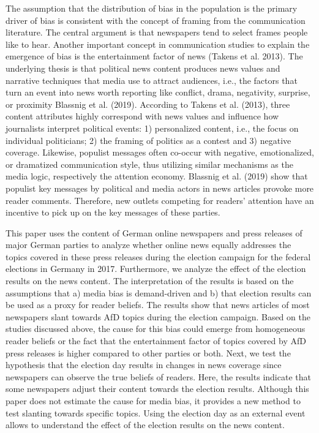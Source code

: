\documentclass[
  12pt,
]{article}
\begin{document}
The assumption that the distribution of bias in the population is the
primary driver of bias is consistent with the concept of framing from
the communication literature. The central argument is that newspapers
tend to select frames people like to hear. Another important concept in
communication studies to explain the emergence of bias is the
entertainment factor of news (Takens et al. 2013). The underlying thesis
is that political news content produces news values and narrative
techniques that media use to attract audiences, i.e., the factors that
turn an event into news worth reporting like conflict, drama,
negativity, surprise, or proximity Blassnig et al. (2019). According to
Takens et al. (2013), three content attributes highly correspond with
news values and influence how journalists interpret political events: 1)
personalized content, i.e., the focus on individual politicians; 2) the
framing of politics as a contest and 3) negative coverage. Likewise,
populist messages often co-occur with negative, emotionalized, or
dramatized communication style, thus utilizing similar mechanisms as the
media logic, respectively the attention economy. Blassnig et al. (2019)
show that populist key messages by political and media actors in news
articles provoke more reader comments. Therefore, new outlets competing
for readers' attention have an incentive to pick up on the key messages
of these parties.

This paper uses the content of German online newspapers and press
releases of major German parties to analyze whether online news equally
addresses the topics covered in these press releases during the election
campaign for the federal elections in Germany in 2017. Furthermore, we
analyze the effect of the election results on the news content. The
interpretation of the results is based on the assumptions that a) media
bias is demand-driven and b) that election results can be used as a
proxy for reader beliefs. The results show that news articles of most
newspapers slant towards AfD topics during the election campaign. Based
on the studies discussed above, the cause for this bias could emerge
from homogeneous reader beliefs or the fact that the entertainment
factor of topics covered by AfD press releases is higher compared to
other parties or both. Next, we test the hypothesis that the election
day results in changes in news coverage since newspapers can observe the
true beliefs of readers. Here, the results indicate that some newspapers
adjust their content towards the election results. Although this paper
does not estimate the cause for media bias, it provides a new method to
test slanting towards specific topics. Using the election day as an
external event allows to understand the effect of the election results
on the news content.
\end{document}
